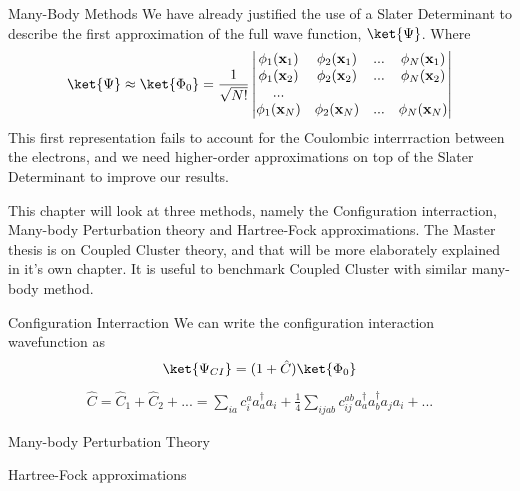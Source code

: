\documentclass[twoside,english]{uiofysmaster}
\begin{document}
\begin{chapter}{Many-Body Methods}
	We have already justified the use of a Slater Determinant to describe the first approximation of the full wave function, $\ket{\Psi}$. Where
	\begin{align}
		\ket{\Psi} \approx \ket{\Phi_0} = 	\frac{1}{ \sqrt{N!} } \left|\begin{matrix}
			\phi_1(\mathbf{x}_1) & \phi_2(\mathbf{x}_1) & ... & \phi_N(\mathbf{x}_1) \\
			\phi_1(\mathbf{x}_2) & \phi_2(\mathbf{x}_2) & ... & \phi_N(\mathbf{x}_2) \\
			... & & & \\
			\phi_1(\mathbf{x}_N) & \phi_2(\mathbf{x}_N) & ... & \phi_N(\mathbf{x}_N) 
		\end{matrix} \right|
	\end{align}	
	This first representation fails to account for the Coulombic interrraction between the electrons, and we need higher-order approximations on top 
	of the Slater Determinant to improve our results. \par
	This chapter will look at three methods, namely the Configuration interraction, Many-body Perturbation theory and Hartree-Fock approximations. The
	Master thesis is on Coupled Cluster theory, and that will be more elaborately explained in it's own chapter. It is useful to benchmark Coupled Cluster 
	with similar many-body method. 

 \begin{section}{Configuration Interraction}
 		We can write the configuration interaction wavefunction as 
  	\begin{align}
  		\ket{\Psi_{CI}} = (1 + \hat C) \ket{\Phi_0} 
   	\end{align}
  	\begin{align}
  		\hat C = \hat C_1 + \hat C_2 + ... =  \sum_{ia} c_i^a a_a^{\dagger} a_i + \frac{1}{4} \sum_{ijab} c_{ij}^{ab} a_a^{\dagger} a_b^{\dagger} a_j a_i + ...
   	\end{align}
 \end{section}	

 \begin{section}{Many-body Perturbation Theory}
 	
 \end{section}

 \begin{section}{Hartree-Fock approximations}
 	
 \end{section}

\end{chapter}
\end{document}

